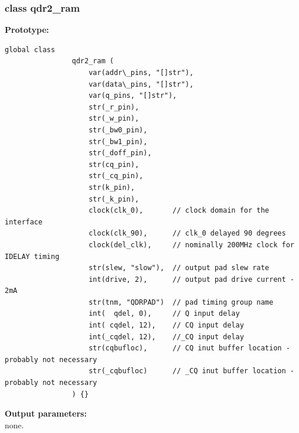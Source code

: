     
        \subsubsection{class qdr2\_ram\label{sec:lcqdr2ram}}
        
            {\bf Prototype:} \\
            \vsp
            \begin{lstlisting}[gobble=12, language=threepl]
                global class
                qdr2_ram (
                    var(addr\_pins, "[]str"),
                    var(data\_pins, "[]str"),
                    var(q_pins, "[]str"),
                    str(_r_pin),
                    str(_w_pin),
                    str(_bw0_pin),
                    str(_bw1_pin),
                    str(_doff_pin),
                    str(cq_pin),
                    str(_cq_pin),
                    str(k_pin),
                    str(_k_pin),
                    clock(clk_0),       // clock domain for the interface
                    clock(clk_90),      // clk_0 delayed 90 degrees
                    clock(del_clk),     // nominally 200MHz clock for IDELAY timing
                    str(slew, "slow"),  // output pad slew rate
                    int(drive, 2),      // output pad drive current - 2mA
                    str(tnm, "QDRPAD")  // pad timing group name
                    int(  qdel, 0),     // Q input delay
                    int( cqdel, 12),    // CQ input delay
                    int(_cqdel, 12),    //_CQ input delay
                    str(cqbufloc),      // CQ inut buffer location - probably not necessary
                    str(_cqbufloc)      // _CQ inut buffer location - probably not necessary
                ) {}
            \end{lstlisting}

            {\bf Output parameters:} \\
            
            none.

